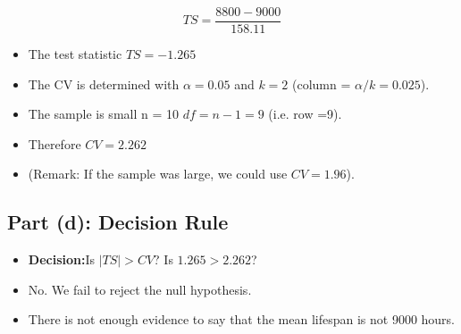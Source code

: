 \documentclass[]{report}
\begin{document}
\[ TS = \frac{8800 - 9000}{158.11} \]
\begin{itemize}
\item The test statistic $TS = -1.265$
\item The CV is determined with $\alpha = 0.05$ and $k = 2$ (column = $\alpha/k=0.025$).
\item The sample is small n = 10 $df = n-1 = 9$ (i.e. row =9).
\item Therefore $CV = 2.262$

\item (Remark: If the sample was large, we could use $CV = 1.96$).

\end{itemize}



\subsection*{Part (d): Decision Rule }

\begin{itemize}
\item \textbf{Decision:}Is $|TS| >CV$? Is $1.265 > 2.262$?
\item No. We fail to reject the null hypothesis. \item There is not enough evidence to say that the mean lifespan is not 9000 hours.
\end{itemize}








\end{document}
